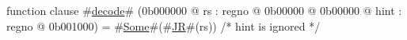 function clause #\hyperref[zdecode]{decode}# (0b000000 @ rs : regno @ 0b00000 @ 0b00000 @ hint : regno @ 0b001000) =
  #\hyperref[zSome]{Some}#(#\hyperref[zJR]{JR}#(rs)) /* hint is ignored */
